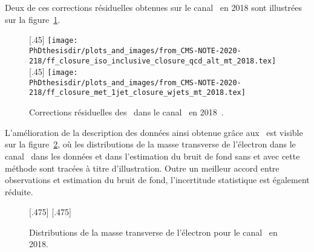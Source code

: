 Deux de ces corrections résiduelles obtenues sur le canal \mu\tauh\ en 2018 sont illustrées sur la figure~\ref{fig-chapter-HTT_analysis-section-bg_estimation-FF_method-closure}.
\begin{figure}[h]
\centering

[.45\textwidth]
{\texttt{[image: \\PhDthesisdir/plots\_and\_images/from\_CMS-NOTE-2020-218/ff\_closure\_iso\_inclusive\_closure\_qcd\_alt\_mt\_2018.tex]}}
\hfill
{}[.45\textwidth]
{\texttt{[image: \\PhDthesisdir/plots\_and\_images/from\_CMS-NOTE-2020-218/ff\_closure\_met\_1jet\_closure\_wjets\_mt\_2018.tex]}}

\caption[Corrections résiduelles des \fakefactors\ dans le canal \mu\tauh\ en 2018.]{Corrections résiduelles des \fakefactors\ dans le canal \mu\tauh\ en 2018~\cite{CMS-NOTE-2020-218}.}
\label{fig-chapter-HTT_analysis-section-bg_estimation-FF_method-closure}
\end{figure}
\par
L'amélioration de la description des données ainsi obtenue grâce aux \fakefactors\ est visible sur la figure~\ref{fig-chapter-HTT_analysis-section-bg_estimation-FF_method-2018et_mT1_illustration}, où les distributions de la masse transverse de l'électron dans le canal \ele\tauh\ dans les données et dans l'estimation du bruit de fond sans et avec cette méthode sont tracées à titre d'illustration.
Outre un meilleur accord entre observations et estimation du bruit de fond, l'incertitude statistique est également réduite.
\begin{figure}[h]
\centering

[.475\textwidth]
{}
\hfill
{}[.475\textwidth]
{}

\caption{Distributions de la masse transverse de l'électron pour le canal \ele\tauh\ en 2018.}
\label{fig-chapter-HTT_analysis-section-bg_estimation-FF_method-2018et_mT1_illustration}
\end{figure}